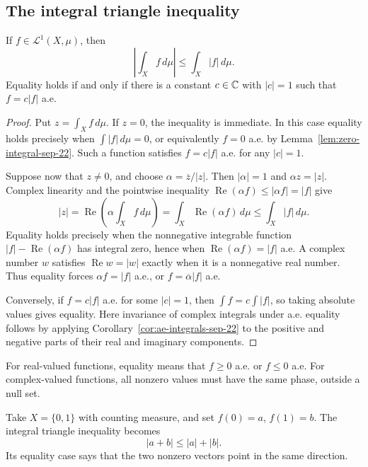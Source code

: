 \subsection{The integral triangle inequality}

\begin{proposition}
  \label{prop:integral-triangle-sep-24}
  If $f\in\mathcal L^1(X,\mu)$, then
  \[
    \left|\int_X f\,d\mu\right|\leq\int_X|f|\,d\mu.
  \]
  Equality holds if and only if there is a constant $c\in\mathbb{C}$ with
  $|c|=1$ such that $f=c|f|$ a.e.
\end{proposition}

\begin{proof}
  Put $z=\int_X f\,d\mu$. If $z=0$, the inequality is immediate.
  In this case equality holds precisely when $\int|f|\,d\mu=0$,
  or equivalently $f=0$ a.e. by Lemma~\ref{lem:zero-integral-sep-22}.
  Such a function satisfies $f=c|f|$ a.e. for any $|c|=1$.

  Suppose now that $z\neq0$, and choose
  $\alpha=\overline z/|z|$. Then $|\alpha|=1$ and
  $\alpha z=|z|$. Complex linearity and the pointwise inequality
  $\operatorname{Re}(\alpha f)\leq|\alpha f|=|f|$ give
  \[
    |z|=\operatorname{Re}\left(\alpha\int_X f\,d\mu\right)
       =\int_X\operatorname{Re}(\alpha f)\,d\mu
       \leq\int_X|f|\,d\mu.
  \]
  Equality holds precisely when the nonnegative integrable function
  $|f|-\operatorname{Re}(\alpha f)$ has integral zero, hence when
  $\operatorname{Re}(\alpha f)=|f|$ a.e. A complex number $w$ satisfies
  $\operatorname{Re}w=|w|$ exactly when it is a nonnegative real
  number. Thus equality forces $\alpha f=|f|$ a.e., or
  $f=\overline\alpha|f|$ a.e.

  Conversely, if $f=c|f|$ a.e. for some $|c|=1$, then
  $\int f=c\int|f|$, so taking absolute values gives equality.
  Here invariance of complex integrals under a.e. equality follows
  by applying Corollary~\ref{cor:ae-integrals-sep-22} to the positive
  and negative parts of their real and imaginary components.
\end{proof}

For real-valued functions, equality means that $f\geq0$ a.e. or
$f\leq0$ a.e. For complex-valued functions, all nonzero values must
have the same phase, outside a null set.

\begin{example}
  Take $X=\{0,1\}$ with counting measure, and set $f(0)=a$, $f(1)=b$.
  The integral triangle inequality becomes
  \[
    |a+b|\leq|a|+|b|.
  \]
  Its equality case says that the two nonzero vectors point in the
  same direction.
\end{example}

